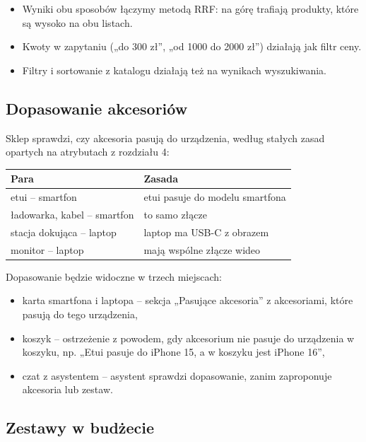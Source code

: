\documentclass[11pt,a4paper]{article}
\begin{document}
\begin{itemize}
  \item Wyniki obu sposobów łączymy metodą RRF: na górę trafiają produkty, które są wysoko na obu listach.
  \item Kwoty w zapytaniu („do 300 zł”, „od 1000 do 2000 zł”) działają jak filtr ceny.
  \item Filtry i sortowanie z katalogu działają też na wynikach wyszukiwania.
\end{itemize}

\subsection{Dopasowanie akcesoriów}\label{sec:dopasowanie}

Sklep sprawdzi, czy akcesoria pasują do urządzenia, według stałych zasad opartych na atrybutach
z rozdziału 4:

{\small
\begin{tabularx}{\textwidth}{P{5cm}L}
\toprule
\textbf{Para} & \textbf{Zasada} \\
\midrule
etui -- smartfon & etui pasuje do modelu smartfona \\
ładowarka, kabel -- smartfon & to samo złącze \\
stacja dokująca -- laptop & laptop ma USB-C z obrazem \\
monitor -- laptop & mają wspólne złącze wideo \\
\bottomrule
\end{tabularx}\par\medskip
}

Dopasowanie będzie widoczne w trzech miejscach:
\begin{itemize}
  \item karta smartfona i laptopa -- sekcja „Pasujące akcesoria” z akcesoriami, które pasują do tego
        urządzenia,
  \item koszyk -- ostrzeżenie z powodem, gdy akcesorium nie pasuje do urządzenia w koszyku, np. „Etui pasuje
        do iPhone 15, a w koszyku jest iPhone 16”,
  \item czat z asystentem -- asystent sprawdzi dopasowanie, zanim zaproponuje akcesoria lub zestaw.
\end{itemize}

\subsection{Zestawy w budżecie}\label{sec:zestawy}
\end{document}
